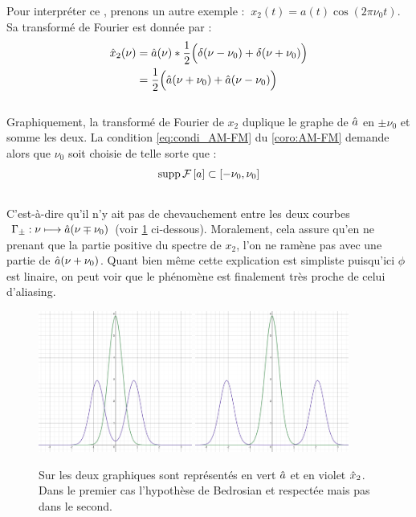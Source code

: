 Pour interpréter ce , prenons un autre exemple : $\ x_2(t) = a(t)\cos(2\pi \nu_0 t)$. Sa transformé de Fourier est donnée par :
\begin{align*}
	\hat{x}_2(\nu) &= \hat{a}(\nu)*\frac{1}{2}\Big(\delta(\nu-\nu_0) + \delta(\nu+\nu_0)\Big) \\
	&= \frac{1}{2}\Big(\hat{a}(\nu+\nu_0) + \hat{a}(\nu-\nu_0)\Big)
\end{align*}
\\
Graphiquement, la transformé de Fourier de $x_2$ duplique le graphe de $\hat{a}$ en $\pm\nu_0$ et somme les deux. La condition \eqref{eq:condi_AM-FM} du \cref{coro:AM-FM} demande alors que $\nu_0$ soit choisie de telle sorte que :
\[\text{\normalfont supp}\, \mathcal{F}\left[a\right]\subset[-\nu_0, \nu_0]\]
\\
C'est-à-dire qu'il n'y ait pas de chevauchement entre les deux courbes $\ \Gamma_\pm : \nu \longmapsto \hat{a}(\nu\mp\nu_0) $ (voir \cref{fig:alising-ish} ci-dessous). Moralement, cela assure qu'en ne prenant que la partie positive du spectre de $x_2$, l'on ne ramène pas avec une partie de $\hat{a}(\nu+\nu_0)$. Quant bien même cette explication est simpliste puisqu'ici $\phi$ est linaire, on peut voir que le phénomène est finalement très proche de celui d'aliasing.
\\

\begin{figure}[h]\centering
	\includegraphics[width=0.45\textwidth]{fig/bedro condi 1.png} 
	\hfill
	\includegraphics[width=0.45\textwidth]{fig/bedro condi 2.png} 
	\caption{Sur les deux graphiques sont représentés en vert $\hat{a}$ et en violet $\hat{x}_2$. Dans le premier cas l'hypothèse de Bedrosian et respectée mais pas dans le second.}
	\label{fig:alising-ish}
\end{figure}


